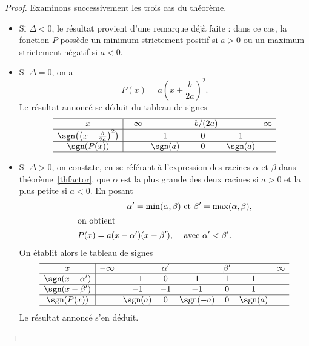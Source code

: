 \begin{proof}
Examinons successivement les trois cas du théorème.
\begin{itemize}
\item  Si $\Delta<0$, le résultat provient d'une remarque déjà faite : dans ce cas, la fonction $P$ possède un minimum strictement positif si $a>0$ ou un maximum strictement négatif si $a<0$. 
\item  Si $\Delta=0$, on a 
\[
P(x)=a\left(x+\frac{b}{2a}\right)^2.
\]
Le résultat annoncé se déduit du tableau de signes
\[\begin{array}{c|ccccc}
\hline
x&-\infty&&-b/(2a)&&\infty\\
\hline
\sgn\bigl(\bigl(x+\frac{b}{2a}\bigr)^2\bigr)&&1&0&1&\\
\hline
\sgn(P(x))&&\sgn(a)&0&\sgn(a)&\\
\hline
\end{array}\]
\item  Si $\Delta>0$, on constate, en se référant à l'expression des racines $\alpha$ et $\beta$ dans théorème \ref{thfactor}, que $\alpha$ est la plus grande des deux racines si $a>0$ et la plus petite si $a<0$. En posant
\begin{align*}\alpha'=\min(\alpha,\beta)&\text{ et }\beta'=\max(\alpha,\beta),\\
\intertext{on obtient}
P(x)=a(x-\alpha')(x-\beta'),\quad&\text{ avec $\alpha'<\beta'$}.
\end{align*}
On établit alors le tableau de signes
{\SmartphoneCommand{\small}
\[\begin{array}{c|ccccccc}
\hline
x&-\infty&&\alpha'&&\beta'&&\infty\\
\hline
\sgn(x-\alpha')&&-1&0&1&1&1&\\
\hline
\sgn(x-\beta')&&-1&-1&-1&0&1&\\
\hline
\sgn(P(x))&&\sgn(a)&0&\sgn(-a)&0&\sgn(a)&\\
\hline
\end{array}
\]}
Le résultat annoncé s'en déduit.\qedhere
\end{itemize}
\end{proof}

